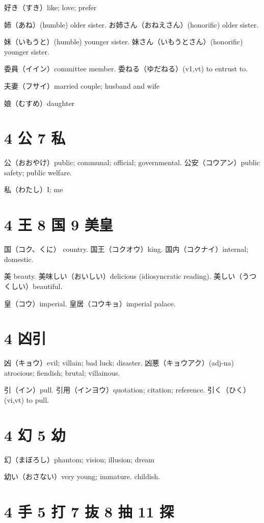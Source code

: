 好き（すき）like; love; prefer

姉（あね）(humble) older sister.
お姉さん（おねえさん）(honorific) older sister.

妹（いもうと）(humble) younger sister.
妹さん（いもうとさん）(honorific) younger sister.

委員（イイン）committee member.
委ねる（ゆだねる）(v1,vt) to entrust to.

夫妻（フサイ）married couple; husband and wife

娘（むすめ）daughter

\section{4 公 7 私}

公（おおやけ）public; communal; official; governmental.
公安（コウアン）public safety; public welfare.

私（わたし）I; me

\section{4 王 8 国 9 美皇}

国（コク、くに） country.
国王（コクオウ）king.
国内（コクナイ）internal; domestic.

美 beauty.
美味しい（おいしい）delicious (idiosyncratic reading).
美しい（うつくしい）beautiful.

皇（コウ）imperial.
皇居（コウキョ）imperial palace.

\section{4 凶引}

凶（キョウ）evil; villain; bad luck; disaster.
凶悪（キョウアク）(adj-na) atrocious; fiendish; brutal; villainous.

引（イン）pull.
引用（インヨウ）quotation; citation; reference.
引く（ひく）(vi,vt) to pull.

\section{4 幻 5 幼}

幻（まぼろし）phantom; vision; illusion; dream

幼い（おさない）very young; immature. childish.

\section{4 手 5 打 7 抜 8 抽 11 探}

